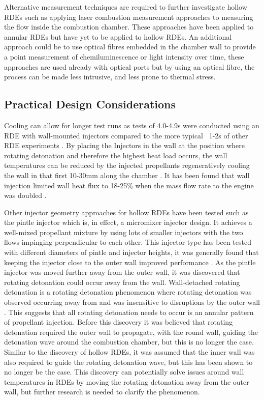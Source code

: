 \documentclass{article}
\begin{document}
Alternative measurement techniques are required to further investigate hollow RDEs such as applying laser combustion measurement approaches to measuring the flow inside the combustion chamber. These approaches have been applied to annular RDEs \cite{Christopher} but have yet to be applied to hollow RDEs. An additional approach could be to use optical fibres embedded in the chamber wall to provide a point measurement of chemiluminescence or light intensity over time, these approaches are used already with optical ports but by using an optical fibre, the process can be made less intrusive, and less prone to thermal stress. 
\par

\subsection{Practical Design Considerations}
Cooling can allow for longer test runs as tests of 4.0-4.9s were conducted using an RDE with wall-mounted injectors compared to the more typical ~1-2s of other RDE experiments \cite{Wang2019}. By placing the Injectors in the wall at the position where rotating detonation and therefore the highest heat load occurs, the wall temperatures can be reduced by the injected propellants regeneratively cooling the wall in that first 10-30mm along the chamber \cite{Goto2020}. It has been found that wall injection limited wall heat flux to 18-25\% when the mass flow rate to the engine was doubled \cite{Goto2022}.
\par

Other injector geometry approaches for hollow RDEs have been tested such as the pintle injector \cite{Huang2019,1Huang2019} which is, in effect, a micromixer injector design. It achieves a well-mixed propellant mixture by using lots of smaller injectors with the two flows impinging perpendicular to each other. This injector type has been tested with different diameters of pintle and injector heights, it was generally found that keeping the injector close to the outer wall improved performance \cite{Huang2019,1Huang2019}. As the pintle injector was moved further away from the outer wall, it was discovered that rotating detonation could occur away from the wall. Wall-detached rotating detonation is a rotating detonation phenomenon where rotating detonation was observed occurring away from and was insensitive to disruptions by the outer wall \cite{1Huang2023}. This suggests that all rotating detonation needs to occur is an annular pattern of propellant injection. Before this discovery it was believed that rotating detonation required the outer wall to propagate, with the round wall, guiding the detonation wave around the combustion chamber, but this is no longer the case. Similar to the discovery of hollow RDEs, it was assumed that the inner wall was also required to guide the rotating detonation wave, but this has been shown to no longer be the case. This discovery can potentially solve issues around wall temperatures in RDEs by moving the rotating detonation away from the outer wall, but further research is needed to clarify the phenomenon.
\par
\end{document}
